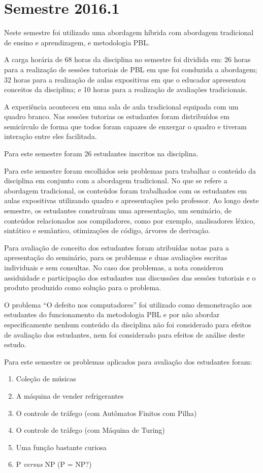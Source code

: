 \section{Semestre 2016.1}

Neste semestre foi utilizado uma abordagem híbrida com abordagem tradicional de ensino
e aprendizagem, e metodologia PBL.

A carga horária de 68 horas da disciplina no semestre foi dividida em:
26 horas para a realização de sessões tutoriais de PBL em que foi conduzida a abordagem;
32 horas para a realização de aulas expositivas em que o educador apresentou conceitos da disciplina;
e 10 horas para a realização de avaliações tradicionais.

A experiência aconteceu em uma sala de aula tradicional equipada com um
quadro branco.
Nas sessões tutorias os estudantes foram distribuídos em semicírculo de forma que todos foram capazes de
enxergar o quadro e tiveram interação entre eles facilitada.

Para este semestre foram 26 estudantes inscritos na disciplina.

Para este semestre foram escolhidos seis problemas para trabalhar o conteúdo da disciplina
em conjunto com a abordagem tradicional.
No que se refere a abordagem tradicional, os conteúdos foram trabalhados com os estudantes
em aulas expositivas utilizando quadro e apresentações pelo professor.
Ao longo deste semestre, os estudantes construíram uma apresentação, um seminário,
de conteúdos relacionados aos compiladores, como por exemplo, analisadores léxico,
sintático e semântico, otimizações de código, árvores de derivação.

Para avaliação de conceito dos estudantes foram atribuídas notas para
a apresentação do seminário, para os problemas e duas avaliações escritas
individuais e sem consultas.
No caso dos problemas, a nota considerou assiduidade e participação dos
estudantes nas discussões das sessões tutoriais e o produto produzido
como solução para o problema.

O problema ``O defeito nos computadores'' foi utilizado como demonstração
aos estudantes do funcionamento da metodologia PBL e por não abordar
especificamente nenhum conteúdo da disciplina não foi considerado para
efeitos de avaliação dos estudantes, nem foi considerado para
efeitos de análise deste estudo.

Para este semestre os problemas aplicados para
avaliação dos estudantes foram:
\begin{enumerate}
\item{Coleção de músicas}
\item{A máquina de vender refrigerantes}
\item{O controle de tráfego (com Autômatos Finitos com Pilha)}
\item{O controle de tráfego (com Máquina de Turing)}
\item{Uma função bastante curiosa}
\item{P \textit{versus} NP (P = NP?)}
\end{enumerate}

